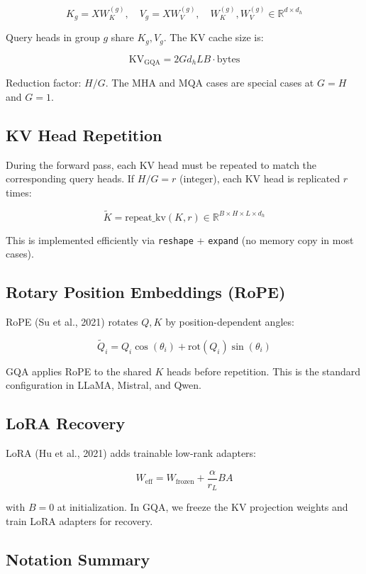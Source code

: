 \[
K_g = X W_K^{(g)}, \quad V_g = X W_V^{(g)}, \quad W_K^{(g)}, W_V^{(g)} \in \mathbb{R}^{d \times d_h}
\tag{3.6}
\]

Query heads in group $g$ share $K_g, V_g$. The KV cache size is:

\[
\text{KV}_\text{GQA} = 2 G d_h L B \cdot \text{bytes}
\tag{3.7}
\]

Reduction factor: $H / G$. The MHA and MQA cases are special cases at 
$G = H$ and $G = 1$.

\subsection{KV Head Repetition}

During the forward pass, each KV head must be repeated to match the 
corresponding query heads. If $H / G = r$ (integer), each KV head is 
replicated $r$ times:

\[
\tilde{K} = \text{repeat\_kv}(K, r) \in \mathbb{R}^{B \times H \times L \times d_h}
\tag{3.8}
\]

This is implemented efficiently via \texttt{reshape} + \texttt{expand} (no memory copy 
in most cases).

\subsection{Rotary Position Embeddings (RoPE)}

RoPE (Su et al., 2021) rotates $Q, K$ by position-dependent angles:

\[
\tilde{Q}_i = Q_i \cos(\theta_i) + \text{rot}(Q_i) \sin(\theta_i)
\tag{3.9}
\]

GQA applies RoPE to the shared $K$ heads before repetition. This is the 
standard configuration in LLaMA, Mistral, and Qwen.

\subsection{LoRA Recovery}

LoRA (Hu et al., 2021) adds trainable low-rank adapters:

\[
W_\text{eff} = W_\text{frozen} + \frac{\alpha}{r_L} B A
\tag{3.10}
\]

with $B = 0$ at initialization. In GQA, we freeze the KV projection weights 
and train LoRA adapters for recovery.

\subsection{Notation Summary}
